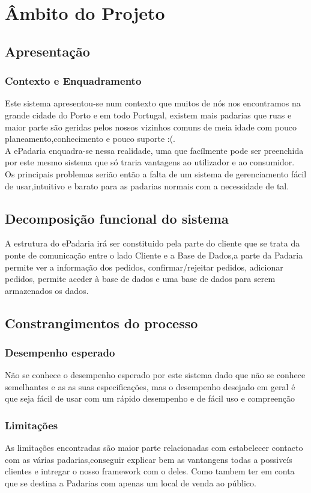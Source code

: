 \chapter{Âmbito do Projeto}
\label{ambito}
\section{Apresentação}
\subsection{Contexto e Enquadramento}
Este sistema apresentou-se num contexto que muitos de nós nos encontramos na grande cidade do Porto e em todo Portugal, existem mais padarias que ruas e maior parte são geridas pelos nossos vizinhos comuns de meia idade com pouco planeamento,conhecimento e pouco suporte :(.\\
A ePadaria enquadra-se nessa realidade, uma que facílmente pode ser preenchida por este mesmo sistema que só traria vantagens ao utilizador e ao consumidor.\\
Os principais problemas serião então a falta de um sistema de gerenciamento fácil de usar,intuitivo e barato para as padarias normais com a necessidade de tal.
\section{Decomposição funcional do sistema}
A estrutura do ePadaria irá ser constituido pela parte do cliente que se trata da ponte de comunicação entre o lado Cliente e a Base de Dados,a parte da Padaria permite ver a informação dos pedidos, confirmar/rejeitar pedidos, adicionar pedidos, permite aceder à base de dados e uma base de dados para serem armazenados os dados.
\section{Constrangimentos do processo}
\subsection{Desempenho esperado}
Não se conhece o desempenho esperado por este sistema dado que não se conhece semelhantes e as as suas especificações, mas o desempenho desejado em geral é que seja fácil de usar com um rápido desempenho e de fácil uso e compreenção
\subsection{Limitações} 
As limitações encontradas são maior parte relacionadas com estabelecer contacto com as várias padarias,conseguir explicar bem as vantangens todas a possiveís clientes e intregar o nosso framework com o deles. Como tambem ter em conta que se destina a Padarias com apenas um local de venda ao público.